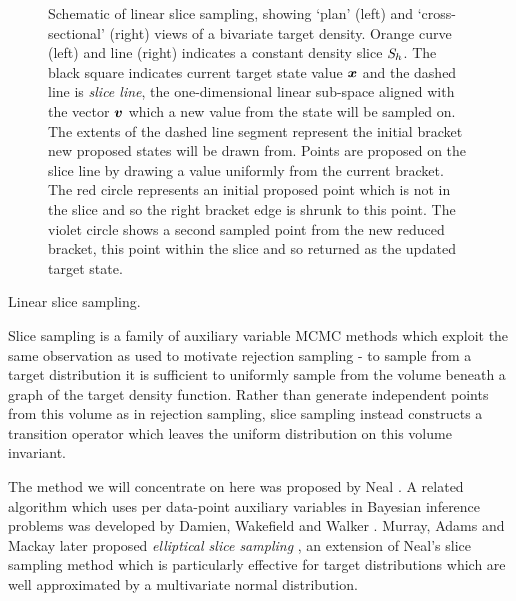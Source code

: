 \begin{figure}[t]
\centering
\begin{subfigure}[b]{.46\linewidth}
\centering
{}
\vspace{3mm}
\end{subfigure}
\begin{subfigure}[b]{.46\linewidth}
\centering
{}
\end{subfigure}
\caption[Visualisation of linear slice sampling.]{Schematic of linear slice sampling, showing `plan' (left) and `cross-sectional' (right) views of a bivariate target density. Orange curve (left) and line (right) indicates a constant density slice $\mathit{S}_h$. The black square indicates current target state value $\boldsymbol{x}$ and the dashed line is \emph{slice line}, the one-dimensional linear sub-space aligned with the vector $\boldsymbol{v}$ which a new value from the state will be sampled on. The extents of the dashed line segment represent the initial bracket new proposed states will be drawn from. Points are proposed on the slice line by drawing a value uniformly from the current bracket. The red circle represents an initial proposed point which is not in the slice and so the right bracket edge is shrunk to this point. The violet circle shows a second sampled point from the new reduced bracket, this point within the slice and so returned as the updated target state.}
\label{fig:slice-sampling}
\end{figure}

\begin{algorithm}[t]
\caption{Linear slice sampling.}
\label{alg:linear-slice-sampling}

\end{algorithm}

Slice sampling is a family of auxiliary variable \ac{MCMC} methods which exploit the same observation as used to motivate rejection sampling - to sample from a target distribution it is sufficient to uniformly sample from the volume beneath a graph of the target density function. Rather than generate independent points from this volume as in rejection samp\-ling, slice sampling instead constructs a transition operator which leaves the uniform distribution on this volume invariant.

The method we will concentrate on here was proposed by Neal \citep{neal1997markov,neal2003slice}. A related algorithm which uses per data-point auxiliary variables in Bayesian inference problems was developed by Damien, Wakefield and Walker \citep{damien1999gibbs}. Murray, Adams and Mackay later proposed \emph{elliptical slice sampling} \citep{murray2010elliptical}, an extension of Neal's slice sampling method which is particularly effective for target distributions which are well approximated by a multivariate normal distribution. %

